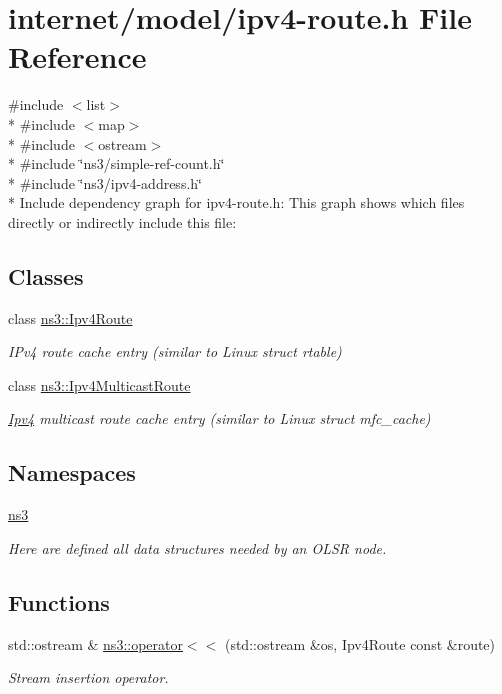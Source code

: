 \hypertarget{ipv4-route_8h}{}\section{internet/model/ipv4-\/route.h File Reference}
\label{ipv4-route_8h}
{\ttfamily \#include $<$list$>$}\\*
{\ttfamily \#include $<$map$>$}\\*
{\ttfamily \#include $<$ostream$>$}\\*
{\ttfamily \#include \char`\"{}ns3/simple-\/ref-\/count.\+h\char`\"{}}\\*
{\ttfamily \#include \char`\"{}ns3/ipv4-\/address.\+h\char`\"{}}\\*
Include dependency graph for ipv4-\/route.h\+:
This graph shows which files directly or indirectly include this file\+:
\subsection*{Classes}
\begin{DoxyCompactItemize}
\item 
class \hyperlink{classns3_1_1Ipv4Route}{ns3\+::\+Ipv4\+Route}
\begin{DoxyCompactList}\small\item\em I\+Pv4 route cache entry (similar to Linux struct rtable) \end{DoxyCompactList}\item 
class \hyperlink{classns3_1_1Ipv4MulticastRoute}{ns3\+::\+Ipv4\+Multicast\+Route}
\begin{DoxyCompactList}\small\item\em \hyperlink{classns3_1_1Ipv4}{Ipv4} multicast route cache entry (similar to Linux struct mfc\+\_\+cache) \end{DoxyCompactList}\end{DoxyCompactItemize}
\subsection*{Namespaces}
\begin{DoxyCompactItemize}
\item 
 \hyperlink{namespacens3}{ns3}
\begin{DoxyCompactList}\small\item\em Here are defined all data structures needed by an O\+L\+SR node. \end{DoxyCompactList}\end{DoxyCompactItemize}
\subsection*{Functions}
\begin{DoxyCompactItemize}
\item 
std\+::ostream \& \hyperlink{namespacens3_a09635dd9350f3e8abcbc6cef7d0ac964}{ns3\+::operator$<$$<$} (std\+::ostream \&os, Ipv4\+Route const \&route)
\begin{DoxyCompactList}\small\item\em Stream insertion operator. \end{DoxyCompactList}\end{DoxyCompactItemize}

